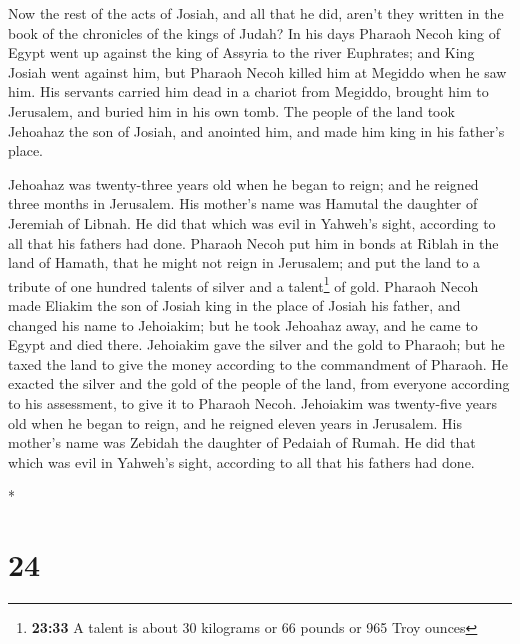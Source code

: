 \begin{paracol}{2}
\begin{otherlanguage}{english}
 Now the rest of the acts of Josiah, and all that he did,
aren't they written in the book of the chronicles of the kings of Judah?
 In his days Pharaoh Necoh king of Egypt went up against
the king of Assyria to the river Euphrates; and King Josiah went against
him, but Pharaoh Necoh killed him at Megiddo when he saw him.
 His servants carried him dead in a chariot from Megiddo,
brought him to Jerusalem, and buried him in his own tomb. The people of
the land took Jehoahaz the son of Josiah, and anointed him, and made him
king in his father's place.

 Jehoahaz was twenty-three years old when he began to
reign; and he reigned three months in Jerusalem. His mother's name was
Hamutal the daughter of Jeremiah of Libnah.  He did that
which was evil in Yahweh's sight, according to all that his fathers had
done.  Pharaoh Necoh put him in bonds at Riblah in the
land of Hamath, that he might not reign in Jerusalem; and put the land
to a tribute of one hundred talents of silver and a talent\footnote{\textbf{23:33}
  A talent is about 30 kilograms or 66 pounds or 965 Troy ounces} of
gold.  Pharaoh Necoh made Eliakim the son of Josiah king
in the place of Josiah his father, and changed his name to Jehoiakim;
but he took Jehoahaz away, and he came to Egypt and died there.
 Jehoiakim gave the silver and the gold to Pharaoh; but
he taxed the land to give the money according to the commandment of
Pharaoh. He exacted the silver and the gold of the people of the land,
from everyone according to his assessment, to give it to Pharaoh Necoh.
 Jehoiakim was twenty-five years old when he began to
reign, and he reigned eleven years in Jerusalem. His mother's name was
Zebidah the daughter of Pedaiah of Rumah.  He did that
which was evil in Yahweh's sight, according to all that his fathers had
done.

\end{otherlanguage}

\switchcolumn[0]*

\hypertarget{section-46}{%
\section{24}\label{section-46}}


\end{paracol}
